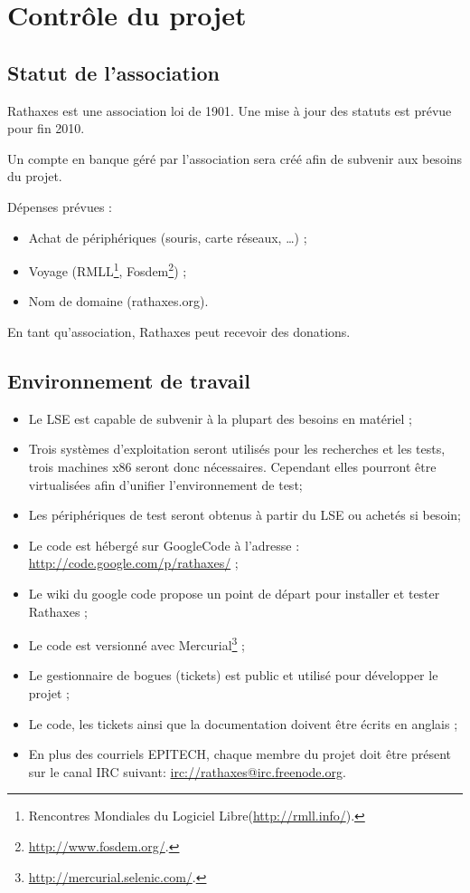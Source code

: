 \section{Contrôle du projet}

\subsection{Statut de l'association}

Rathaxes est une association loi de 1901. Une mise à jour des statuts est
prévue pour fin 2010.

Un compte en banque géré par l'association sera créé afin de subvenir aux
besoins du projet.

Dépenses prévues :
\begin{itemize}
\item Achat de périphériques (souris, carte réseaux, \ldots) ;
\item Voyage (RMLL\footnote{Rencontres Mondiales du Logiciel
Libre(\url{http://rmll.info/}).},
Fosdem\footnote{\url{http://www.fosdem.org/}.}) ;
\item Nom de domaine (rathaxes.org).
\end{itemize}

En tant qu'association, Rathaxes peut recevoir des donations.

\subsection{Environnement de travail}

\begin{itemize}
\item Le LSE est capable de subvenir à la plupart des besoins en matériel ;
\item Trois systèmes d'exploitation seront utilisés pour les recherches et les
tests, trois machines x86 seront donc nécessaires. Cependant elles pourront
être virtualisées afin d'unifier l'environnement de test;
\item Les périphériques de test seront obtenus à partir du LSE ou achetés si
besoin;
\item Le code est hébergé sur GoogleCode à l'adresse :
\url{http://code.google.com/p/rathaxes/} ;
\item Le wiki du google code propose un point de départ pour installer et
tester Rathaxes ;
\item Le code est versionné avec
Mercurial\footnote{\url{http://mercurial.selenic.com/}.} ;
\item Le gestionnaire de bogues (tickets) est public et utilisé pour développer
le projet ;
\item Le code, les tickets ainsi que la documentation doivent être écrits en
anglais ;
\item En plus des courriels EPITECH, chaque membre du projet doit être présent
sur le canal IRC suivant: \url{irc://rathaxes@irc.freenode.org}.
\end{itemize}

